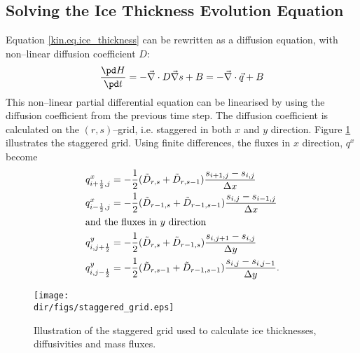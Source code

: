 \subsection{Solving the Ice Thickness Evolution Equation}
Equation \eqref{kin.eq.ice_thickness} can be rewritten as a diffusion equation, with non--linear diffusion coefficient $D$:
\begin{equation}
  \label{kin.eq.ice_evo}
  \frac{\pd H}{\pd t}=-\vec\nabla\cdot D\vec\nabla s+B=-\vec\nabla\cdot\vec q+B
\end{equation}
This non--linear partial differential equation can be linearised by using the diffusion coefficient from the previous time step. The diffusion coefficient is calculated on the $(r,s)$--grid, i.e. staggered in both $x$ and $y$ direction. Figure \ref{kin.fig.staggered_grid} illustrates the staggered grid. Using finite differences, the fluxes in $x$ direction, $q^x$ become
\begin{subequations}
\begin{align}
  q^x_{i+\frac12,j}&=-\frac12(\tilde{D}_{r,s}+\tilde{D}_{r,s-1})\frac{s_{i+1,j}-s_{i,j}}{\Delta x}\\
  q^x_{i-\frac12,j}&=-\frac12(\tilde{D}_{r-1,s}+\tilde{D}_{r-1,s-1})\frac{s_{i,j}-s_{i-1,j}}{\Delta x}\\
  \intertext{and the fluxes in $y$ direction}
  q^y_{i,j+\frac12}&=-\frac12(\tilde{D}_{r,s}+\tilde{D}_{r-1,s})\frac{s_{i,j+1}-s_{i,j}}{\Delta y}\\
  q^y_{i,j-\frac12}&=-\frac12(\tilde{D}_{r,s-1}+\tilde{D}_{r-1,s-1})\frac{s_{i,j}-s_{i,j-1}}{\Delta y}.
\end{align}  
\end{subequations}

\begin{figure}[htbp]
  \centering
  \texttt{[image: \\dir/figs/staggered\_grid.eps]}
  \caption{Illustration of the staggered grid used to calculate ice thicknesses, diffusivities and mass fluxes.}
  \label{kin.fig.staggered_grid}
\end{figure}


